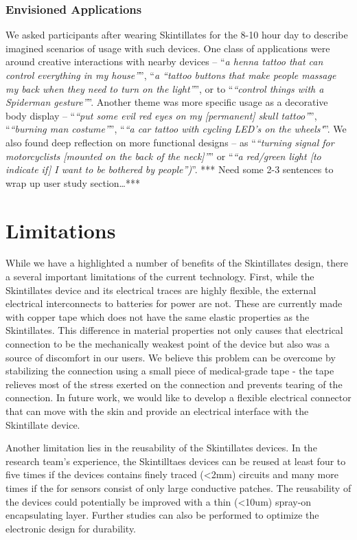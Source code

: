 \documentclass{sigchi}
\begin{document}
\subsubsection{Envisioned Applications}
We asked participants after wearing Skintillates for the 8-10 hour day to describe imagined scenarios of usage with such devices. One class of applications were around creative interactions with nearby devices – ``\textit{a henna tattoo that can control everything in my house”}'', ``\textit{a “tattoo buttons that make people massage my back when they need to turn on the light”}'', or to ``\textit{“control things with a Spiderman gesture”}''.  Another theme was more specific usage as a decorative body display – ``\textit{“put some evil red eyes on my [permanent] skull tattoo”}'', ``\textit{“burning man costume”}'',  ``\textit{“a car tattoo with cycling LED’s on the wheels"}''. We also found deep reflection on more functional designs -- as ``\textit{“turning signal for motorcyclists [mounted on the back of the neck]”}'' or ``\textit{“a red/green light [to indicate if] I want to be bothered by people”)}''.
*** Need some 2-3 sentences to wrap up user study section…***
\section {Limitations}
While we have a highlighted a number of benefits of the Skintillates design, there a several important limitations of the current technology. First, while the Skintillates device and its electrical traces are highly flexible, the external electrical interconnects to batteries for power are not.  These are currently made with copper tape which does not have the same elastic properties as the Skintillates. This difference in material properties not only causes that electrical connection to be the mechanically weakest point of the device but also was a source of discomfort in our users. We believe this problem can be overcome by stabilizing the connection using a small piece of medical-grade tape - the tape relieves most of the stress exerted on the connection and prevents tearing of the connection. In future work, we would like to develop a flexible electrical connector that can move with the skin and provide an electrical interface with the Skintillate device.

Another limitation lies in the reusability of the Skintillates devices. In the research team's experience, the Skintilltaes devices can be reused at least four to five times if the devices contains finely traced (\textless 2mm) circuits and many more times if the for sensors consist of only large conductive patches. The reusability of the devices could potentially be improved with a thin (\textless10um) spray-on encapsulating layer. Further studies can also be performed to optimize the electronic design for durability. 
\end{document}
